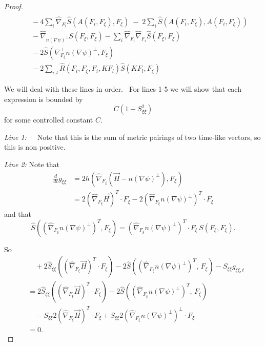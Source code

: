\documentclass[12pt,letterpaper]{amsart}%
\numberwithin{mycounter}{section}
\theoremstyle{plain}
\numberwithin{equation}{section}
\theoremstyle{definition}
\newcommand{\maxidx}{\mathord{\xi}} %
\begin{document}
\begin{proof}
\begin{align*}
\tag{2}\label{eq:L2}\\
&\quad -4\sum_{i}\hat{\nabla}_{F_{i}}\hat{S}(A(F_{i},F_{\maxidx}),F_{\maxidx})
   \;-\;2\sum_{i}\hat{S}(A(F_{i},F_{\maxidx}),A(F_{i},F_{\maxidx}))
\tag{3}\label{eq:L3}\\
&\quad -\hat{\nabla}_{n(\nabla\psi)^{\perp}}S(F_{\maxidx},F_{\maxidx})
   -\sum_{i}\hat{\nabla}_{F_{i}}\hat{\nabla}_{F_{i}}\hat{S}(F_{\maxidx},F_{\maxidx})
\tag{4}\label{eq:L4}\\
&\quad -2\hat{S}\left( \nabla_{F_{\maxidx}}^{\perp}n(\nabla\psi)^{\perp},F_{\maxidx}\right)
\tag{5}\label{eq:L5}\\
&\quad -2\sum_{i,l}\hat{R}(F_{i},F_{\maxidx},F_{i},KF_{l})\hat{S}(KF_{l},F_{\maxidx})
\tag{6}\label{eq:L6}
\end{align*}

We will deal with these lines in order. \ For lines 1-5 we will show that each
expression is bounded by%
\[
C(1+S_{\maxidx\maxidx}^{2})
\]
for some controlled constant $C.$

\textit{Line 1:}\ \ \ Note that this is the sum of metric pairings of two time-like
vectors, so this is non positive.

\textit{Line 2:} Note that
\begin{align*}
\frac{d}{dt}g_{\maxidx\maxidx} 
&=2h(\hat{\nabla}_{F_{\maxidx}}\left(  \vec{H}-n\left(
\nabla\psi\right)  ^{\perp}\right)  ,F_{\maxidx})\\
&=2(\hat{\nabla}_{F_{\maxidx}}\vec{H})^{T}\cdot F_{\maxidx}
   -2\left(  \hat{\nabla}%
_{F_{\maxidx}}n\left(  \nabla\psi\right)  ^{\perp}\right)  ^{T}\cdot F_{\maxidx}
\end{align*}
and that
\[
\hat{S}\left(  (\hat{\nabla}_{F_{\maxidx}}n\left(  \nabla\psi\right)  ^{\perp}%
)^{T},F_{\maxidx}\right)
=(\hat{\nabla}_{F_{\maxidx}}n\left(  \nabla\psi\right)  ^{\perp})^{T}
\cdot F_{\maxidx}\, S(F_{\maxidx},F_{\maxidx}).
\]

So
\begin{align*}
&\quad 
+2\hat{S}_{\maxidx\maxidx}\left( (\hat{\nabla}_{F_{\maxidx}}\vec{H})^{T}\!\cdot F_{\maxidx}\right)
-2\hat{S}\!\left( (\hat{\nabla}_{F_{\maxidx}} n(\nabla\psi)^{\perp})^{T},\,F_{\maxidx}\right)
-S_{\maxidx\maxidx} g_{\maxidx\maxidx,t}
\\[0.5em]
&= 
2\hat{S}_{\maxidx\maxidx}\left( (\hat{\nabla}_{F_{\maxidx}}\vec{H})^{T}\!\cdot F_{\maxidx}\right)
-2\hat{S}\!\left( (\hat{\nabla}_{F_{\maxidx}} n(\nabla\psi)^{\perp})^{T},\,F_{\maxidx}\right)
\\
&\quad 
-S_{\maxidx\maxidx} 2(\hat{\nabla}_{F_{\maxidx}}\vec{H})^{T}\!\cdot F_{\maxidx}
+S_{\maxidx\maxidx} 2\left( \hat{\nabla}_{F_{\maxidx}} n(\nabla\psi)^{\perp} \right)^{\perp}\!\cdot F_{\maxidx}
\\[0.5em]
&=0.
\end{align*}


\end{proof}
\end{document}
